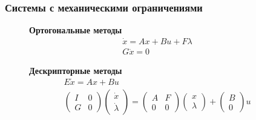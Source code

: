 \begin{frame}
	\frametitle{Системы с механическими ограничениями}
    \begin{figure}
	\begin{minipage}[c]{0.4\textwidth}
		\textbf{Ортогональные методы}
		\begin{equation*}
			\begin{gathered}
				\dot{x}=Ax+Bu+F\lambda\\
				G\dot{x}=0
			\end{gathered}
		\end{equation*}
	\end{minipage}\hfill
	\begin{minipage}[c]{0.6\textwidth}
		\textbf{Дескрипторные методы}
		\begin{equation*}
			\begin{gathered}
				E\dot{x}=Ax+Bu\\
				\begin{pmatrix}
					I & 0\\
					G & 0
				\end{pmatrix}
				\begin{pmatrix}
					\dot{x}\\ \dot{\lambda}
				\end{pmatrix}=
				\begin{pmatrix}
					A & F\\ 0 & 0
				\end{pmatrix}
				\begin{pmatrix}
					x\\ \lambda
				\end{pmatrix}+
				\begin{pmatrix}
					B \\ 0
				\end{pmatrix}
				u
			\end{gathered}
		\end{equation*}
	\end{minipage}
\end{figure}
\end{frame}
